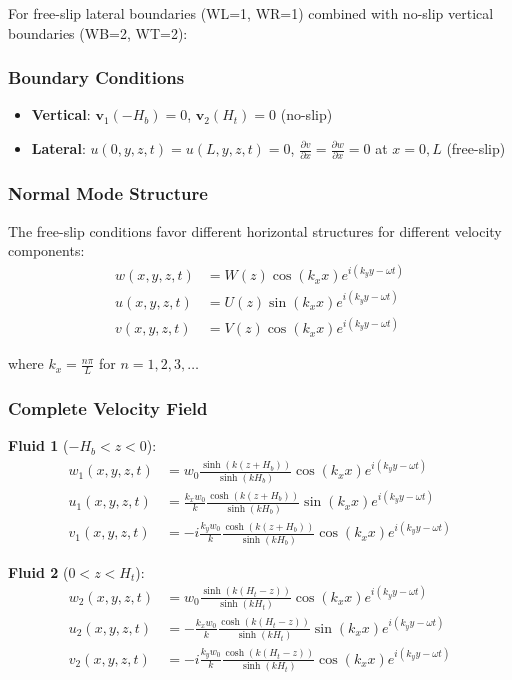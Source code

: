 \documentclass[12pt,a4paper]{article}
\begin{document}
For free-slip lateral boundaries (WL=1, WR=1) combined with no-slip vertical boundaries (WB=2, WT=2):

\subsubsection{Boundary Conditions}
\begin{itemize}
    \item \textbf{Vertical}: $\mathbf{v}_1(-H_b) = 0$, $\mathbf{v}_2(H_t) = 0$ (no-slip)
    \item \textbf{Lateral}: $u(0,y,z,t) = u(L,y,z,t) = 0$, $\frac{\partial v}{\partial x} = \frac{\partial w}{\partial x} = 0$ at $x = 0, L$ (free-slip)
\end{itemize}

\subsubsection{Normal Mode Structure}

The free-slip conditions favor different horizontal structures for different velocity components:
\begin{align}
w(x,y,z,t) &= W(z)\cos(k_x x)e^{i(k_y y - \omega t)} \\
u(x,y,z,t) &= U(z)\sin(k_x x)e^{i(k_y y - \omega t)} \\
v(x,y,z,t) &= V(z)\cos(k_x x)e^{i(k_y y - \omega t)}
\end{align}

where $k_x = \frac{n\pi}{L}$ for $n = 1, 2, 3, \ldots$

\subsubsection{Complete Velocity Field}

\textbf{Fluid 1} ($-H_b < z < 0$):
\begin{align}
w_1(x,y,z,t) &= w_0 \frac{\sinh(k(z + H_b))}{\sinh(kH_b)} \cos(k_x x) e^{i(k_y y - \omega t)} \\
u_1(x,y,z,t) &= \frac{k_x w_0}{k} \frac{\cosh(k(z + H_b))}{\sinh(kH_b)} \sin(k_x x) e^{i(k_y y - \omega t)} \\
v_1(x,y,z,t) &= -i\frac{k_y w_0}{k} \frac{\cosh(k(z + H_b))}{\sinh(kH_b)} \cos(k_x x) e^{i(k_y y - \omega t)}
\end{align}

\textbf{Fluid 2} ($0 < z < H_t$):
\begin{align}
w_2(x,y,z,t) &= w_0 \frac{\sinh(k(H_t - z))}{\sinh(kH_t)} \cos(k_x x) e^{i(k_y y - \omega t)} \\
u_2(x,y,z,t) &= -\frac{k_x w_0}{k} \frac{\cosh(k(H_t - z))}{\sinh(kH_t)} \sin(k_x x) e^{i(k_y y - \omega t)} \\
v_2(x,y,z,t) &= -i\frac{k_y w_0}{k} \frac{\cosh(k(H_t - z))}{\sinh(kH_t)} \cos(k_x x) e^{i(k_y y - \omega t)}
\end{align}
\end{document}
